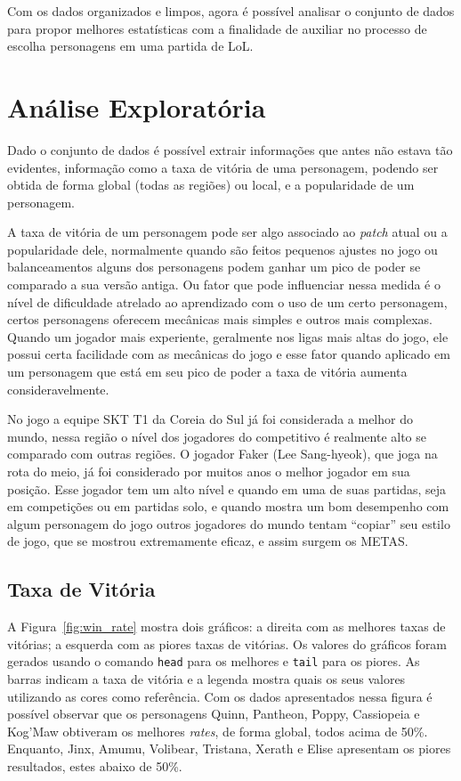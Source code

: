 \documentclass[a4paper]{article}
\begin{document}
Com os dados organizados e limpos, agora é possível analisar o conjunto de dados para propor melhores estatísticas com a finalidade de auxiliar no processo de escolha personagens em uma partida de LoL.

\section{Análise Exploratória}


Dado o conjunto de dados é possível extrair informações que antes não estava tão evidentes, informação como a taxa de vitória de uma personagem, podendo ser obtida de forma global (todas as regiões) ou local, e a popularidade de um personagem.

A taxa de vitória de um personagem pode ser algo associado ao \textit{patch} atual ou a popularidade dele, normalmente quando são feitos pequenos ajustes no jogo ou balanceamentos alguns dos personagens podem ganhar um pico de poder se comparado a sua versão antiga. Ou fator que pode influenciar nessa medida é o nível de dificuldade atrelado ao aprendizado com o uso de um certo personagem, certos personagens oferecem mecânicas mais simples e outros mais complexas. Quando um jogador mais experiente, geralmente nos ligas mais altas do jogo, ele possui certa facilidade com as mecânicas do jogo e esse fator quando aplicado em um personagem que está em seu pico de poder a taxa de vitória aumenta consideravelmente. 

No jogo a equipe SKT T1 da Coreia do Sul já foi considerada a melhor do mundo, nessa região o nível dos jogadores do competitivo é realmente alto se comparado com outras regiões. O jogador Faker (Lee Sang-hyeok), que joga na rota do meio, já foi considerado por muitos anos o melhor jogador em sua posição. Esse jogador tem um alto nível e quando em uma de suas partidas, seja em competições ou em partidas solo, e quando mostra um bom desempenho com algum personagem do jogo outros jogadores do mundo tentam “copiar” seu estilo de jogo, que se mostrou extremamente eficaz, e assim surgem os METAS.

\subsection{Taxa de Vitória}

A Figura~\ref{fig:win_rate} mostra dois gráficos: a direita com as melhores taxas de vitórias; a esquerda com as piores taxas de vitórias. Os valores do gráficos foram gerados usando o comando \texttt{head} para os melhores e \texttt{tail} para os piores. As barras indicam a taxa de vitória e a legenda mostra quais os seus valores utilizando as cores como referência. Com os dados apresentados nessa figura é possível observar que os personagens Quinn, Pantheon, Poppy, Cassiopeia e Kog’Maw obtiveram os melhores \textit{rates}, de forma global, todos acima de 50\%. Enquanto, Jinx, Amumu, Volibear, Tristana, Xerath e Elise apresentam os piores resultados, estes abaixo de 50\%. 
\end{document}
